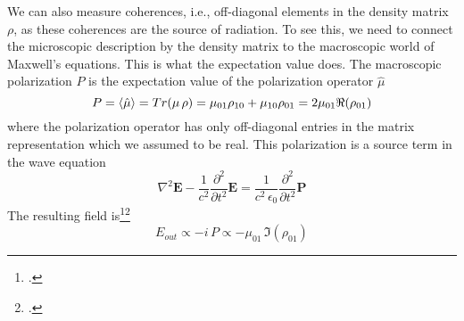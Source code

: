 We can also measure coherences, i.e., off-diagonal elements in the density matrix $\rho$, as these coherences are the source of radiation. To see this, we need to connect the microscopic description by the density matrix to the macroscopic world of Maxwell's equations. This is what the expectation value does. The macroscopic polarization $P$ is the expectation value of the polarization operator $\hat{\mu}$
\[
 P = \braket{\hat{\mu}} = Tr ( \mu \, \rho) = \mu_{01} \rho_{10} + \mu_{10} \rho_{01} = 2   \mu_{01} \Re (\rho_{01})
\]
where the polarization operator has only off-diagonal entries in the matrix representation which we assumed to be real. This polarization is a source term in the wave equation
\[
 \nabla^2 \boldsymbol{E} - \frac{1}{c^2} \frac{\partial^2}{\partial t^2} \boldsymbol{E} 
 =  
\frac{1}{c^2\, \epsilon_0} \frac{\partial^2}{\partial t^2} \boldsymbol{P}  
\]
The resulting field is\footcite[eq. 4.4]{Hamm-dummies}\footcite[eq. 3.9.16 !! update nomenclature !!]{Rand2016}
\[
  E_{out} \propto -i \, P \propto - \mu_{01} \, \Im ( \rho_{01} )
\]





\printbibliography[segment=\therefsegment,heading=subbibliography]
